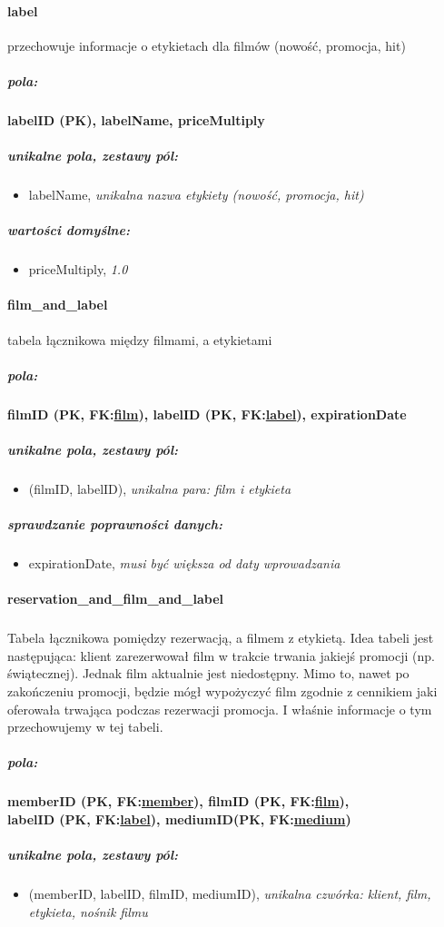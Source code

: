 \documentclass[12pt,a4paper,titlepage]{article}
\begin{document}
\paragraph{label} przechowuje informacje o etykietach dla filmów (nowość, promocja, hit)
\subparagraph{pola:}
\textbf{labelID (PK), labelName, priceMultiply}
\subparagraph{unikalne pola, zestawy pól:}
\begin{itemize}
	\item labelName, \textit{unikalna nazwa etykiety (nowość, promocja, hit)}
\end{itemize}
\subparagraph{wartości domyślne:}
\begin{itemize}
	\item priceMultiply, \textit{1.0}
\end{itemize}

\paragraph{film\_and\_label} tabela łącznikowa między filmami, a etykietami
\subparagraph{pola:}
\textbf{filmID (PK, FK:\underline{film}), labelID (PK, FK:\underline{label}), expirationDate}
\subparagraph{unikalne pola, zestawy pól:}
\begin{itemize}
	\item (filmID, labelID), \textit{unikalna para: film i etykieta}
\end{itemize}
\subparagraph{sprawdzanie poprawności danych:}
\begin{itemize}
	\item expirationDate, \textit{musi być większa od daty wprowadzania}
\end{itemize}

\newpage

\paragraph{reservation\_and\_film\_and\_label}
\subparagraph{}
Tabela łącznikowa pomiędzy rezerwacją, a filmem z etykietą. Idea tabeli jest następująca: klient zarezerwował film w trakcie trwania jakiejś promocji (np. świątecznej).
Jednak film aktualnie jest niedostępny. Mimo to, nawet po zakończeniu promocji, będzie mógł wypożyczyć film zgodnie z cennikiem jaki oferowała trwająca podczas rezerwacji promocja.
I właśnie informacje o tym przechowujemy w tej tabeli.
\subparagraph{pola:}
\textbf{memberID (PK, FK:\underline{member}), filmID (PK, FK:\underline{film}),} \\\textbf{labelID (PK, FK:\underline{label}), mediumID(PK, FK:\underline{medium})}
\subparagraph{unikalne pola, zestawy pól:}
\begin{itemize}
	\item (memberID, labelID, filmID, mediumID), \textit{unikalna czwórka: klient, film, etykieta, nośnik filmu}
\end{itemize}
\end{document}
